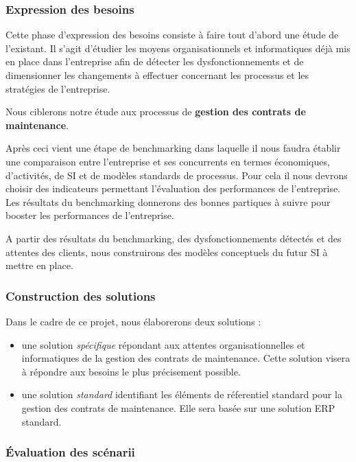 \subsubsection*{Expression des besoins}

Cette phase d'expression des besoins consiste \`a faire tout d'abord une \'etude de l'existant.
Il s'agit d'\'etudier les moyens organisationnels et informatiques d\'ej\`a mis en place dans l'entreprise afin de détecter les dysfonctionnements et de dimensionner les changements \`a effectuer concernant les processus et les strat\'egies de l'entreprise.

Nous ciblerons notre \'etude aux processus de \textbf{gestion des contrats de maintenance}.

Apr\`es ceci vient une \'etape de benchmarking dans laquelle il nous faudra \'etablir une comparaison entre l'entreprise et ses concurrents en termes \'economiques, d'activit\'es, de SI et de mod\`eles standards de processus.
Pour cela il nous devrons choisir des indicateurs permettant l'\'evaluation des performances de l'entreprise. Les r\'esultats du benchmarking donnerons des bonnes partiques \`a suivre pour booster les performances de l'entreprise.

A partir des r\'esultats du benchmarking, des dysfonctionnements d\'etect\'es et des  attentes des clients, nous construirons des mod\`eles conceptuels du futur SI \`a mettre en place.

\subsubsection*{Construction des solutions}

Dans le cadre de ce projet, nous \'elaborerons deux solutions :

\begin{itemize}
 \item une solution \textit{sp\'ecifique} r\'epondant aux attentes organisationnelles et informatiques de la gestion des contrats de maintenance. Cette solution visera \`a r\'epondre aux besoins le plus pr\'ecisement possible.
 \item une solution \textit{standard} identifiant les \'el\'ements de r\'eferentiel standard pour la gestion des contrats de maintenance. Elle sera bas\'ee sur une solution ERP standard.
\end{itemize}

\subsubsection*{\'Evaluation des sc\'enarii}

